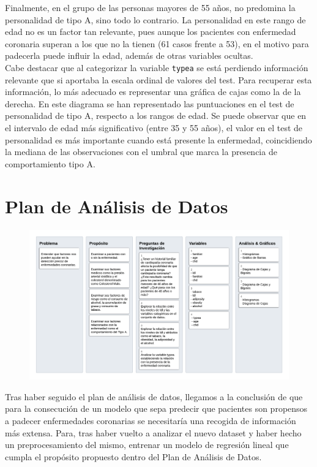 \documentclass[a4paper, 9pt]{article}
\begin{document}
Finalmente, en el grupo de las personas mayores de 55 años, no predomina la personalidad de tipo A, sino todo lo contrario. La personalidad en este rango de edad no es un factor tan relevante, pues aunque los pacientes con enfermedad coronaria superan a los que no la tienen (61 casos frente a 53), en el motivo para padecerla puede influir la edad, además de otras variables ocultas. \\

Cabe destacar que al categorizar la variable \texttt{typea} se está perdiendo información relevante que si aportaba la escala ordinal de valores del test. Para recuperar esta información, lo más adecuado es representar una gráfica de cajas como la de la derecha. En este diagrama se han representado las puntuaciones en el test de personalidad de tipo A, respecto a los rangos de edad. Se puede observar que en el intervalo de edad más significativo (entre 35 y 55 años), el valor en el test de personalidad es más importante cuando está presente la enfermedad, coincidiendo la mediana de las observaciones con el umbral que marca la presencia de comportamiento tipo A.

\vspace{5mm}

\section{Plan de Análisis de Datos}

\begin{figure}[H]
    \centering
    \includegraphics[scale=0.2]{images/data_analysis/plan.png}
    \label{image:data-ana}
\end{figure}

\vspace{3mm}

Tras haber seguido el plan de análisis de datos, llegamos a la conclusión de que para la consecución de un modelo que sepa predecir que pacientes son propensos a padecer enfermedades coronarias se necesitaría una recogida de información más extensa. Para, tras haber vuelto a analizar el nuevo dataset y haber hecho un preprocesamiento del mismo, entrenar un modelo de regresión lineal que cumpla el propósito propuesto dentro del Plan de Análisis de Datos.
\end{document}
